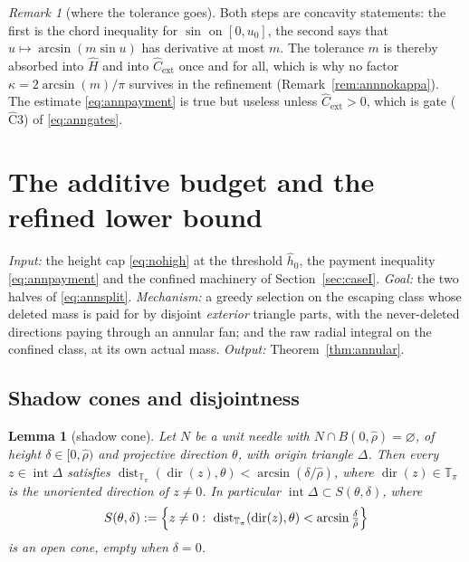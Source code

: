 \documentclass[11pt]{article}
\theoremstyle{plain}
\newtheorem{lemma}[theorem]{Lemma}
\theoremstyle{definition}
\theoremstyle{remark}
\newtheorem{remark}[theorem]{Remark}
\newcommand{\Tp}{\mathbb{T}_{\pi}}
\begin{document}
\begin{remark}[where the tolerance goes]\label{rem:annconcavity}
Both steps are concavity statements: the first is the chord inequality for
$\sin$ on $[0,u_{0}]$, the second says that $u\mapsto\arcsin(m\sin u)$ has
derivative at most $m$. The tolerance $m$ is thereby absorbed into $\hat H$ and
into $\hat C_{\mathrm{ext}}$ once and for all, which is why no factor
$\kappa=2\arcsin(m)/\pi$ survives in the refinement
(Remark~\ref{rem:annnokappa}). The estimate \eqref{eq:annpayment} is true but
useless unless $\hat C_{\mathrm{ext}}>0$, which is gate
\textup{(}$\widehat{\mathrm{C}}3$\textup{)} of \eqref{eq:anngates}.
\end{remark}

\section{The additive budget and the refined lower bound}\label{sec:annbudget}

\emph{Input:} the height cap \eqref{eq:nohigh} at the threshold $\hat h_{0}$,
the payment inequality \eqref{eq:annpayment} and the confined machinery of
Section~\ref{sec:caseI}. \emph{Goal:} the two halves of \eqref{eq:annsplit}.
\emph{Mechanism:} a greedy selection on the escaping class whose deleted mass
is paid for by disjoint \emph{exterior} triangle parts, with the never-deleted
directions paying through an annular fan; and the raw radial integral on the
confined class, at its own actual mass. \emph{Output:}
Theorem~\ref{thm:annular}.

\subsection{Shadow cones and disjointness}\label{sec:anncones}

\begin{lemma}[shadow cone]\label{lem:annshadowcone}
Let $N$ be a unit needle with $N\cap B(0,\hat\rho)=\varnothing$, of height
$\delta\in[0,\hat\rho)$ and projective direction $\theta$, with origin triangle
$\Delta$. Then every $z\in\operatorname{int}\Delta$ satisfies
$\operatorname{dist}_{\Tp}(\operatorname{dir}(z),\theta)
<\arcsin(\delta/\hat\rho)$, where $\operatorname{dir}(z)\in\Tp$ is the
unoriented direction of $z\ne0$. In particular
$\operatorname{int}\Delta\subset S(\theta,\delta)$, where
\[
  S(\theta,\delta):=\Bigl\{z\ne0:\
    \operatorname{dist}_{\Tp}(\operatorname{dir}(z),\theta)
    <\arcsin\tfrac{\delta}{\hat\rho}\Bigr\}
\]
is an open cone, empty when $\delta=0$.
\end{lemma}
\end{document}
